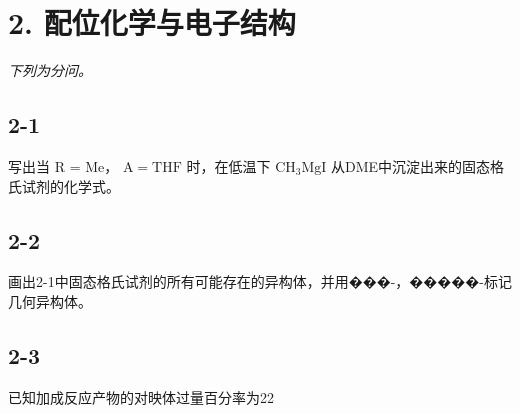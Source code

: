 \section*{2. 配位化学与电子结构}
\textit{下列为分问。}

\subsection*{2-1}
写出当 R = Me， $\mathrm { A } = \mathrm { T H F }$ 时，在低温下 $\mathrm { C H _ { 3 } M g I }$ 从DME中沉淀出来的固态格⽒试剂的化学式。

\subsection*{2-2}
画出2-1中固态格⽒试剂的所有可能存在的异构体，并⽤���-，�����-标记⼏何异构体。

\subsection*{2-3}
已知加成反应产物的对映体过量百分率为22%
